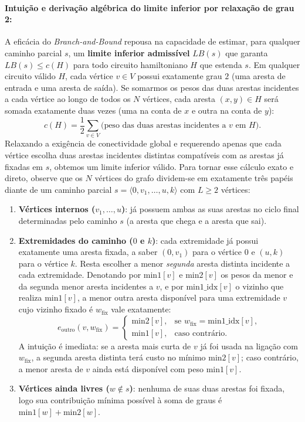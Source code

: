 \paragraph{Intuição e derivação algébrica do limite inferior por relaxação de grau 2:}
A eficácia do \textit{Branch-and-Bound} repousa na capacidade de estimar, para qualquer caminho
parcial $s$, um \textbf{limite inferior admissível} $LB(s)$ que garanta $LB(s) \le c(H)$ para
todo circuito hamiltoniano $H$ que estenda $s$. Em qualquer circuito válido $H$, cada vértice
$v \in V$ possui exatamente grau $2$ (uma aresta de entrada e uma aresta de saída). Se somarmos
os pesos das duas arestas incidentes a cada vértice ao longo de todos os $N$ vértices, cada
aresta $(x, y) \in H$ será somada exatamente duas vezes (uma na conta de $x$ e outra na conta
de $y$):
\begin{equation}
  c(H) = \frac{1}{2} \sum_{v \in V} \bigl(\text{peso das duas arestas incidentes a } v \text{ em } H\bigr).
\end{equation}
Relaxando a exigência de conectividade global e requerendo apenas que cada vértice escolha duas
arestas incidentes distintas compatíveis com as arestas já fixadas em $s$, obtemos um limite
inferior válido. Para tornar esse cálculo exato e direto, observe que os $N$ vértices do grafo
dividem-se em exatamente três papéis diante de um caminho parcial
$s = \langle 0, v_1, \dots, u, k \rangle$ com $L \ge 2$ vértices:
\begin{enumerate}
  \item \textbf{Vértices internos ($v_1, \dots, u$)}: já possuem ambas as suas arestas no ciclo
  final determinadas pelo caminho $s$ (a aresta que chega e a aresta que sai).
  \item \textbf{Extremidades do caminho ($0$ e $k$)}: cada extremidade já possui exatamente uma
  aresta fixada, a saber $(0, v_1)$ para o vértice $0$ e $(u, k)$ para o vértice $k$. Resta
  escolher a menor \emph{segunda} aresta distinta incidente a cada extremidade. Denotando por
  $\text{min1}[v]$ e $\text{min2}[v]$ os pesos da menor e da segunda menor aresta incidentes a
  $v$, e por $\text{min1\_idx}[v]$ o vizinho que realiza $\text{min1}[v]$, a menor outra aresta
  disponível para uma extremidade $v$ cujo vizinho fixado é $w_{\text{fix}}$ vale exatamente:
  \begin{equation}
    e_{\text{outro}}(v, w_{\text{fix}}) =
    \begin{cases}
      \text{min2}[v], & \text{se } w_{\text{fix}} = \text{min1\_idx}[v], \\
      \text{min1}[v], & \text{caso contrário.}
    \end{cases}
    \label{eq:e_outro}
  \end{equation}
  A intuição é imediata: se a aresta mais curta de $v$ já foi usada na ligação com
  $w_{\text{fix}}$, a segunda aresta distinta terá custo no mínimo $\text{min2}[v]$; caso
  contrário, a menor aresta de $v$ ainda está disponível com peso $\text{min1}[v]$.
  \item \textbf{Vértices ainda livres ($w \notin s$)}: nenhuma de suas duas arestas foi fixada,
  logo sua contribuição mínima possível à soma de graus é $\text{min1}[w] + \text{min2}[w]$.
\end{enumerate}

